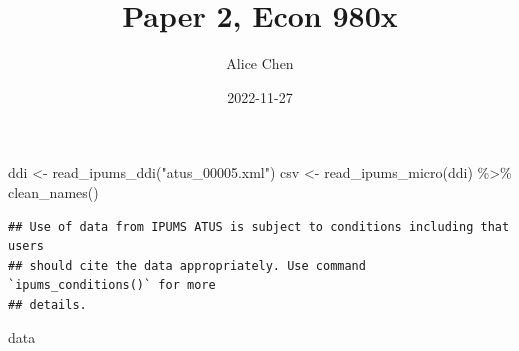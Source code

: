 \documentclass[
]{article}
\title{Paper 2, Econ 980x}
\author{Alice Chen}
\date{2022-11-27}
\newenvironment{Shaded}{\begin{snugshade}}{\end{snugshade}}
\newcommand{\FunctionTok}[1]{\textcolor[rgb]{0.00,0.00,0.00}{#1}}
\newcommand{\NormalTok}[1]{#1}
\newcommand{\OtherTok}[1]{\textcolor[rgb]{0.56,0.35,0.01}{#1}}
\newcommand{\SpecialCharTok}[1]{\textcolor[rgb]{0.00,0.00,0.00}{#1}}
\newcommand{\StringTok}[1]{\textcolor[rgb]{0.31,0.60,0.02}{#1}}
\begin{document}
\maketitle

\begin{Shaded}
\begin{Highlighting}[]
\NormalTok{ddi }\OtherTok{\textless{}{-}} \FunctionTok{read\_ipums\_ddi}\NormalTok{(}\StringTok{"atus\_00005.xml"}\NormalTok{)}
\NormalTok{csv }\OtherTok{\textless{}{-}} \FunctionTok{read\_ipums\_micro}\NormalTok{(ddi) }\SpecialCharTok{\%\textgreater{}\%}
  \FunctionTok{clean\_names}\NormalTok{()}
\end{Highlighting}
\end{Shaded}

\begin{verbatim}
## Use of data from IPUMS ATUS is subject to conditions including that users
## should cite the data appropriately. Use command `ipums_conditions()` for more
## details.
\end{verbatim}

\begin{Shaded}
\begin{Highlighting}[]
\NormalTok{data}
\end{Highlighting}
\end{Shaded}
\end{document}
